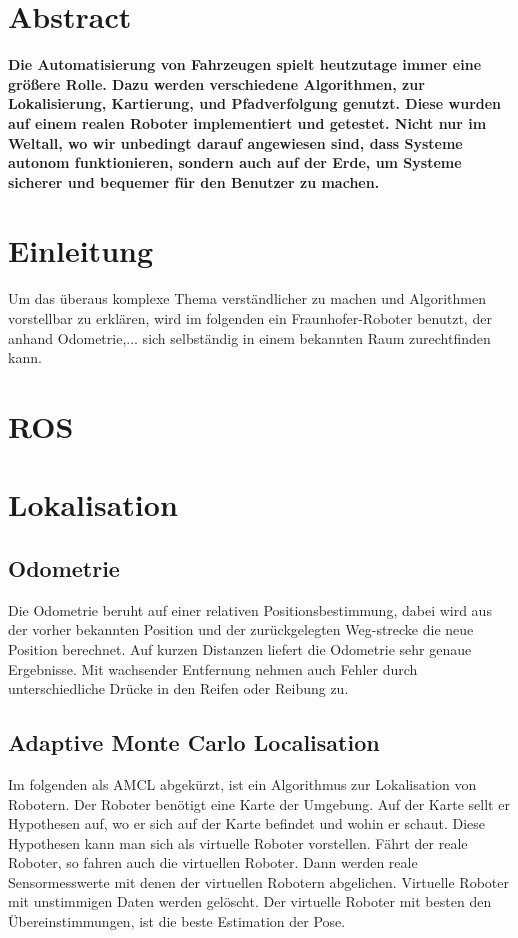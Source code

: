 \documentclass[11pt,a4paper]{article}
\begin{document}
\section*{Abstract}
{
\textbf{Die Automatisierung von Fahrzeugen spielt heutzutage immer eine gr\"o\ss{}ere Rolle. Dazu werden verschiedene Algorithmen, zur Lokalisierung, Kartierung, und Pfadverfolgung genutzt. Diese wurden auf einem realen Roboter implementiert und getestet.  Nicht nur im Weltall, wo wir unbedingt darauf angewiesen sind, dass Systeme autonom funktionieren, sondern auch auf der Erde, um Systeme sicherer und bequemer f\"ur den Benutzer zu machen. }


\section{Einleitung}
Um das überaus komplexe Thema verst\"andlicher zu machen und Algorithmen vorstellbar zu erkl\"aren, wird im folgenden ein Fraunhofer-Roboter benutzt, der anhand Odometrie,... sich selbst\"andig in einem bekannten Raum zurechtfinden kann.

\section{ROS}

\section{Lokalisation}
\subsection{Odometrie}
{Die Odometrie beruht auf einer relativen Positionsbestimmung, dabei wird aus der vorher bekannten Position und der zur\"uckgelegten Weg-strecke die neue Position berechnet. Auf kurzen Distanzen liefert die Odometrie sehr genaue Ergebnisse. Mit wachsender Entfernung nehmen auch Fehler durch unterschiedliche Dr\"ucke in den Reifen oder Reibung zu.
	
	
	
	}
\subsection{Adaptive  Monte Carlo Localisation}
Im folgenden als AMCL abgek\"urzt, ist ein Algorithmus zur Lokalisation von Robotern. Der Roboter ben\"otigt eine Karte der Umgebung. Auf der Karte sellt er Hypothesen auf, wo er sich auf der Karte befindet und wohin er schaut. Diese Hypothesen kann man sich als virtuelle Roboter vorstellen. Fährt der reale Roboter, so fahren auch die virtuellen Roboter. Dann werden reale Sensormesswerte mit denen der virtuellen Robotern abgelichen. Virtuelle Roboter mit unstimmigen Daten werden gel\"oscht. Der virtuelle Roboter  mit besten den Übereinstimmungen, ist die beste Estimation der Pose. 


}
\end{document}
